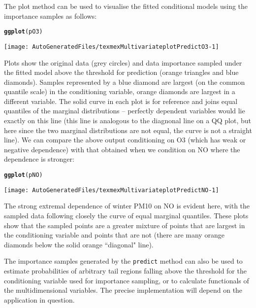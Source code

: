 \documentclass[10pt]{article}\usepackage[]{graphicx}\usepackage[]{color}
\makeatletter
\def\maxwidth{ %
  \ifdim\Gin@nat@width>\linewidth
    \linewidth
  \else
    \Gin@nat@width
  \fi
}
\newcommand{\hlstd}[1]{\textcolor[rgb]{0.345,0.345,0.345}{#1}}%
\newcommand{\hlkwd}[1]{\textcolor[rgb]{0.737,0.353,0.396}{\textbf{#1}}}%
\newenvironment{kframe}{%
 \def\at@end@of@kframe{}%
 \ifinner\ifhmode%
  \def\at@end@of@kframe{\end{minipage}}%
  \begin{minipage}{\columnwidth}%
 \fi\fi%
 \def\FrameCommand##1{\hskip\@totalleftmargin \hskip-\fboxsep
 \colorbox{shadecolor}{##1}\hskip-\fboxsep
     \hskip-\linewidth \hskip-\@totalleftmargin \hskip\columnwidth}%
 \MakeFramed {\advance\hsize-\width
   \@totalleftmargin\z@ \linewidth\hsize
   \@setminipage}}%
 {\par\unskip\endMakeFramed%
 \at@end@of@kframe}
\newenvironment{knitrout}{}{} %
\makeatother
\begin{document}
The plot method can be used to visualise the fitted conditional models using the
importance samples as follows:
\begin{knitrout}
\color{fgcolor}\begin{kframe}
\begin{alltt}
\hlkwd{ggplot}\hlstd{(pO3)}
\end{alltt}
\end{kframe}
\texttt{[image: AutoGeneratedFiles/texmexMultivariateplotPredictO3-1]} 

\end{knitrout}

Plots show the original data (grey circles) and data importance sampled under
the fitted model above the threshold for prediction (orange triangles  and blue diamonds).  Samples represented by a blue diamond are largest (on the common quantile scale) in the conditioning variable, orange diamonds are largest in a different variable.  The solid curve in each plot is for reference and joins equal quantiles of the marginal
distributions -- perfectly dependent variables would lie exactly on this line
(this line is analogous to the diagnonal line on a QQ plot, but here since the
two marginal distributions are not equal, the curve is not a straight line). We
can compare the above output conditioning on O3 (which has weak or negative
dependence) with that obtained when we condition on NO where the dependence is
stronger:

\begin{knitrout}
\color{fgcolor}\begin{kframe}
\begin{alltt}
\hlkwd{ggplot}\hlstd{(pNO)}
\end{alltt}
\end{kframe}
\texttt{[image: AutoGeneratedFiles/texmexMultivariateplotPredictNO-1]} 

\end{knitrout}
The strong extremal dependence of winter PM10 on NO is evident here, with the
sampled data following closely the curve of equal marginal quantiles.  These plots show that the sampled points are a greater mixture of points that are largest in the conditioning variable and points that are not (there are many orange diamonds below the solid orange ``diagonal" line).

The importance samples generated by the {\tt predict} method can also be used to
estimate probabilities of arbitrary tail regions falling above the threshold for
the conditioning variable used for importance sampling, or to calculate
functionals of the multidimensional variables.  The precise implementation will
depend on the application in question.
\end{document}
